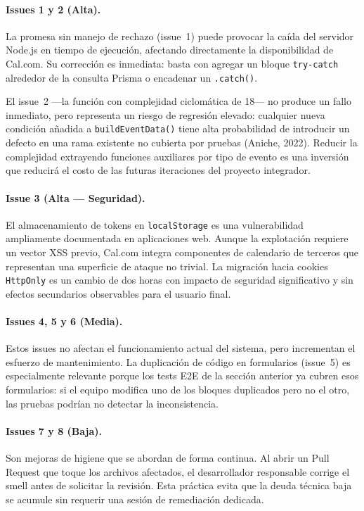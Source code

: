 \documentclass{article}
\begin{document}
\paragraph{Issues 1 y 2 (Alta).}
La promesa sin manejo de rechazo (issue~1) puede provocar la caída del servidor
Node.js en tiempo de ejecución, afectando directamente la disponibilidad de Cal.com.
Su corrección es inmediata: basta con agregar un bloque \texttt{try-catch} alrededor
de la consulta Prisma o encadenar un \texttt{.catch()}.

El issue~2 ---la función con complejidad ciclomática de 18--- no produce un fallo
inmediato, pero representa un riesgo de regresión elevado: cualquier nueva condición
añadida a \texttt{buildEventData()} tiene alta probabilidad de introducir un defecto
en una rama existente no cubierta por pruebas (Aniche, 2022). Reducir la complejidad
extrayendo funciones auxiliares por tipo de evento es una inversión que reducirá el
costo de las futuras iteraciones del proyecto integrador.

\paragraph{Issue 3 (Alta --- Seguridad).}
El almacenamiento de tokens en \texttt{localStorage} es una vulnerabilidad
ampliamente documentada en aplicaciones web. Aunque la explotación requiere un
vector XSS previo, Cal.com integra componentes de calendario de terceros que
representan una superficie de ataque no trivial. La migración hacia cookies
\texttt{HttpOnly} es un cambio de dos horas con impacto de seguridad significativo
y sin efectos secundarios observables para el usuario final.

\paragraph{Issues 4, 5 y 6 (Media).}
Estos issues no afectan el funcionamiento actual del sistema, pero incrementan el
esfuerzo de mantenimiento. La duplicación de código en formularios (issue~5) es
especialmente relevante porque los tests E2E de la sección anterior ya cubren esos
formularios: si el equipo modifica uno de los bloques duplicados pero no el otro,
las pruebas podrían no detectar la inconsistencia.

\paragraph{Issues 7 y 8 (Baja).}
Son mejoras de higiene que se abordan de forma continua. Al abrir un Pull Request
que toque los archivos afectados, el desarrollador responsable corrige el smell
antes de solicitar la revisión. Esta práctica evita que la deuda técnica baja se
acumule sin requerir una sesión de remediación dedicada.
\end{document}
